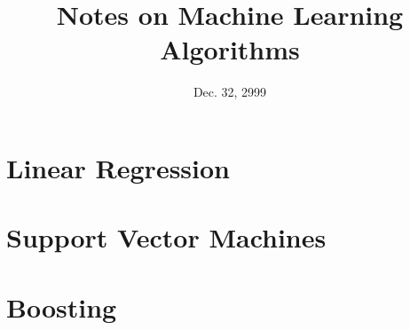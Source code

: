 \documentclass[12pt]{article}
\theoremstyle{definition}
\begin{document}
\title{Notes on Machine Learning Algorithms}
\date{Dec. 32, 2999}

\maketitle

\section{Linear Regression}

\section{Support Vector Machines}

\section{Boosting}

\end{document}
